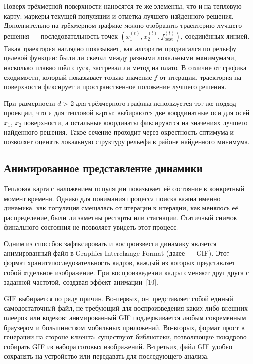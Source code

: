 \documentclass[14pt, russian]{scrartcl}
\begin{document}
Поверх трёхмерной поверхности наносятся те же элементы, что и на тепловую
карту: маркеры текущей популяции и отметка лучшего найденного решения.
Дополнительно на трёхмерном графике можно отобразить траекторию лучшего
решения --- последовательность точек $(x_1^{(t)}, x_2^{(t)},
f_{\text{best}}^{(t)})$, соединённых линией. Такая траектория наглядно
показывает, как алгоритм продвигался по рельефу целевой функции: были ли
скачки между разными локальными минимумами, насколько плавно шёл спуск,
застревал ли метод на плато. В отличие от графика сходимости, который
показывает только значение $f$ от итерации, траектория на поверхности
фиксирует и пространственное положение лучшего решения.

При размерности $d > 2$ для трёхмерного графика используется тот же
подход проекции, что и для тепловой карты: выбираются две координатные
оси для осей $x_1$, $x_2$ поверхности, а остальные координаты фиксируются
на значениях лучшего найденного решения. Такое сечение проходит через
окрестность оптимума и позволяет оценить локальную структуру рельефа
в районе найденного минимума.

\subsection{Анимированное представление динамики}

Тепловая карта с наложением популяции показывает её состояние в конкретный
момент времени. Однако для понимания процесса поиска важна именно
динамика: как популяция смещалась от итерации к итерации, как менялось
её распределение, были ли заметны рестарты или стагнации. Статичный
снимок финального состояния не позволяет увидеть этот процесс.

Одним из способов зафиксировать и воспроизвести динамику является
анимированный файл в Graphics Interchange Format (далее --- GIF). 
Этот формат хранитvпоследовательность кадров, каждый из которых представляет собой
отдельное изображение. При воспроизведении кадры сменяют друг друга
с заданной частотой, создавая эффект анимации~[10].

GIF выбирается по ряду причин. Во-первых, он представляет собой единый
самодостаточный файл, не требующий для воспроизведения каких-либо
внешних плееров или кодеков: анимированный GIF поддерживается любым
современным браузером и большинством мобильных приложений. Во-вторых,
формат прост в генерации на стороне клиента: существуют библиотеки,
позволяющие покадрово собирать GIF из набора готовых изображений.
В-третьих, файл GIF удобно сохранять на устройство или передавать для
последующего анализа.
\end{document}
